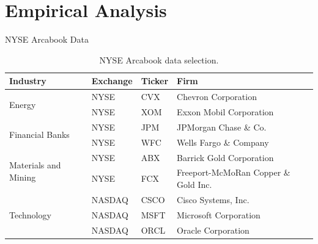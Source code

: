 \documentclass{beamer}
\begin{document}
\section{Empirical Analysis}
\begin{frame}[shrink=35]{{\color{cyan}NYSE Arcabook Data}}
\bigskip
\begin{table}[H]
\begin{center}
\begin{tabular}{llll}
\hline
\textbf{Industry} & \textbf{Exchange} & \textbf{Ticker} & \textbf{Firm}\\
\hline \hline

\multirow{2}{*}{Energy} & NYSE & CVX & Chevron Corporation\\
 & NYSE & XOM & Exxon Mobil Corporation\\

\hline
\multirow{2}{*}{Financial Banks} & NYSE & JPM & JPMorgan Chase \& Co.\\
 & NYSE & WFC & Wells Fargo \& Company \\

 \hline
 \multirow{2}{*}{Materials and Mining} & NYSE & ABX & Barrick Gold Corporation \\
 & NYSE & FCX & Freeport-McMoRan Copper \& Gold Inc. \\

 \hline
 \multirow{3}{*}{Technology} & NASDAQ & CSCO & Cisco Systems, Inc. \\
 & NASDAQ & MSFT & Microsoft Corporation \\
 & NASDAQ & ORCL & Oracle Corporation \\
\hline
\end{tabular}
\end{center}
\caption{NYSE Arcabook data selection.}
\label{table:NYSE_Arcabook_Selection}
\end{table}

\end{frame}


\end{document}
